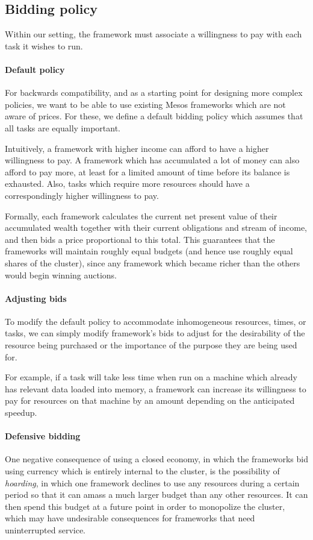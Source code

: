 \documentclass{acm_proc_article-sp}
\begin{document}
\subsection{Bidding policy}
Within our setting, the framework must associate a willingness to pay with each
task it wishes to run. 
\vspace{-5mm}
\paragraph{Default policy} For backwards compatibility, 
and as a starting point for designing more complex policies, we want to be able to
use existing Mesos frameworks which are not aware of prices. For these, we
define a default bidding policy which assumes that all tasks are equally
important.

Intuitively, a framework with higher income can afford to have a higher
willingness to pay. A framework which has accumulated a lot of money can also
afford to pay more, at least for a limited amount of time before its balance is
exhausted. Also, tasks which require more resources should have a
correspondingly higher willingness to pay.

Formally, each framework calculates the current net present value
of their accumulated wealth together with their current obligations
and stream of income, and then bids a price proportional
to this total. This guarantees that the frameworks will
maintain roughly equal budgets (and hence use roughly equal shares
of the cluster), since any framework which became richer
than the others would begin winning auctions.
\vspace{-5mm}
\paragraph{Adjusting bids} To modify the 
default policy to accommodate inhomogeneous resources,
times, or tasks, we can simply modify framework's
bids to adjust for the desirability of the resource being
purchased or the importance of the purpose they are being used for.

For example, if a task will take less time when run on a machine
which already has relevant data loaded into memory,
a framework can increase its willingness to pay for resources on that machine
by an amount depending on the anticipated speedup.
\vspace{-5mm}
\paragraph{Defensive bidding} One negative consequence of using a closed economy,
in which the frameworks bid using currency which is entirely internal to the cluster,
is the possibility of \emph{hoarding}, in which one framework
declines to use any resources during a certain period so that it can amass
a much larger budget than any other resources.
It can then spend this budget at a future point in order to monopolize the cluster,
which may have undesirable consequences for frameworks that need uninterrupted service.
\end{document}
